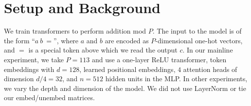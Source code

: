 \documentclass{article} %
\begin{document}


\section{Setup and Background}
\label{sec:experimental-setup}

We train transformers to perform addition mod $P$. The input to the model is of the form ``$a\ b\ \!=$'', where $a$ and $b$ are encoded as $P$-dimensional one-hot vectors, and $=$ is a special token above which we read the output $c$. In our mainline experiment, we take $P=113$ and use a one-layer ReLU transformer, token embeddings with $d=128$, learned positional embeddings, $4$ attention heads of dimension $d/4=32$, and $n = 512$ hidden units in the MLP. In other experiments, we vary the depth and dimension of the model. 
We did not use LayerNorm or tie our embed/unembed matrices.
\end{document}
